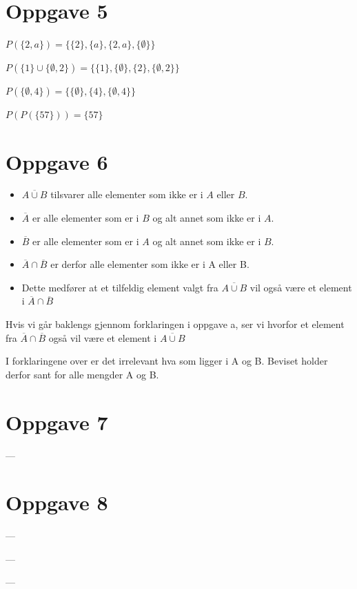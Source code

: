 \documentclass{in1150-innlevering}
\begin{document}
\section*{Oppgave 5}
\begin{deloppgaver}
  \item $P(\{2,a\}) = \{\{2\},\{a\},\{2,a\},\{\emptyset\}\}$
  \item $P(\{1\}\cup\{\emptyset, 2\}) = \{\{1\},\{\emptyset\},\{2\},\{\emptyset, 2\}\}$
  \item $P(\{\emptyset, 4\}) = \{\{\emptyset\},\{4\},\{\emptyset, 4\}\}$
  \item $P(P(\{57\})) = \{57\}$
\end{deloppgaver}
\section*{Oppgave 6}
\begin{deloppgaver}
  \item 
    \begin{itemize}
      \item
          $\overline{A\cup B}$ tilsvarer alle elementer som ikke er i $A$ eller $B$.
      \item
        $\overline{A}$ er alle elementer som er i $B$ og alt annet som ikke er i $A$.
      \item
        $\overline{B}$ er alle elementer som er i $A$ og alt annet som ikke er i $B$.
      \item
        $\overline{A} \cap \overline{B}$ er derfor alle elementer som ikke er i A eller B.
      \item
        Dette medfører at et tilfeldig element valgt fra $\overline{A\cup B}$ vil også være et element i $\overline{A} \cap \overline{B}$ 
    \end{itemize}
  \item
    Hvis vi går baklengs gjennom forklaringen i oppgave a, ser vi hvorfor et element fra  $\overline{A} \cap \overline{B}$ også vil være et element i $\overline{A\cup B}$
  \item
    I forklaringene over er det irrelevant hva som ligger i A og B. Beviset holder derfor sant for alle mengder A og B.
\end{deloppgaver}

\section*{Oppgave 7}
---

\section*{Oppgave 8}
  \begin{deloppgaver}
    \item ---
    \item ---
    \item ---
  \end{deloppgaver}
\end{document}
